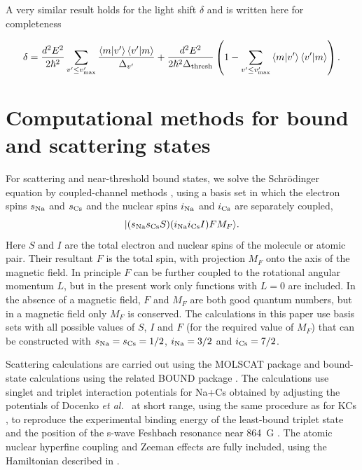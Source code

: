 \documentclass[aps,prx,secnumarabic,amsmath,amssymb,10pt,superscriptaddress]{revtex4-2}
\begin{document}
A very similar result holds for the light shift $\delta$ and is written here for completeness

\begin{equation}
  \delta = \frac{d^2E^2}{2\hbar^2}\displaystyle\sum_{v' \leq v'_{\text{max}}} \frac{\braket{m|v'}\braket{v'|m}}{\Delta_{v'}} +  \frac{d^2E^2}{2\hbar^2\Delta_{\text{thresh}}}\left(1 - \displaystyle\sum_{v' \leq v'_{\text{max}}}\braket{m|v'}\braket{v'|m}\right).
\end{equation}

\section{Computational methods for bound and scattering states}

For scattering and near-threshold bound states, we solve the Schr\"odinger equation by
coupled-channel methods \cite{HUTSON1994}, using a basis set in which the electron spins
$s_{\rm Na}$ and $s_{\rm Cs}$ and the nuclear spins $i_{\rm Na}$ and $i_{\rm Cs}$ are separately
coupled,
\begin{equation}
  | (s_{\rm Na} s_{\rm Cs} S)
  (i_{\rm Na} i_{\rm Cs} I) F M_F\rangle.
  \label{eqbassif}
\end{equation}
Here $S$ and $I$ are the total electron and nuclear spins of the molecule or atomic pair. Their
resultant $F$ is the total spin, with projection $M_F$ onto the axis of the magnetic field. In
principle $F$ can be further coupled to the rotational angular momentum $L$, but in the present
work only functions with $L=0$ are included. In the absence of a magnetic field, $F$ and $M_F$ are
both good quantum numbers, but in a magnetic field only $M_F$ is conserved. The calculations in
this paper use basis sets with all possible values of $S$, $I$ and $F$ (for the required value of
$M_F$) that can be constructed with $s_{\rm Na} = s_{\rm Cs} = 1/2$,
$i_{\rm Na} = 3/2$ and $i_{\rm Cs} = 7/2$.

Scattering calculations are carried out using the MOLSCAT package \cite{molscat:2019,
  mbf-github:2020} and bound-state calculations using the related BOUND package
\cite{bound+field:2019, mbf-github:2020}. The calculations use singlet and triplet interaction
potentials for Na+Cs obtained by adjusting the potentials of Docenko \emph{et al.}\
\cite{Docenko2006} at short range, using the same procedure as for KCs \cite{Groebner2017},
to reproduce the experimental binding energy of the least-bound triplet state \cite{Hood2019}
and the position of the s-wave Feshbach resonance near 864~G \cite{Zhang2020}. The atomic
nuclear hyperfine coupling and Zeeman effects are fully included, using the Hamiltonian described
in \cite{Hutson2008}.
\end{document}
